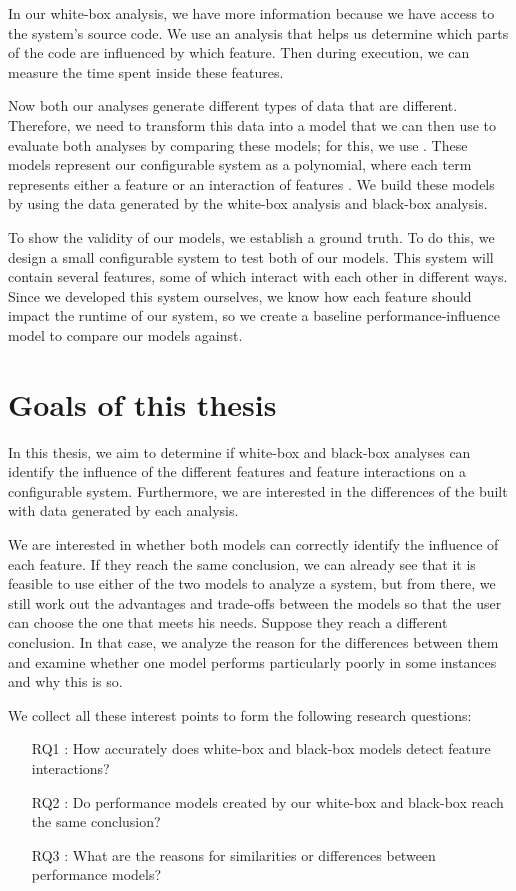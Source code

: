In our white-box analysis, we have more information because we have access to the system's source code.
We use an analysis that helps us determine which parts of the code are influenced by which feature.
Then during execution, we can measure the time spent inside these features.

Now both our analyses generate different types of data that are different. 
Therefore, we need to transform this data into a model that we can then use to evaluate both analyses by comparing these models; 
for this, we use \perfInfluenceModel. These models represent our configurable system as a polynomial, 
where each term represents either a feature or an interaction of features \cite{Performance-influence-models-for-highly-configurable-systems}.
We build these models by using the data generated by the white-box analysis and black-box analysis. 

To show the validity of our models, we establish a ground truth. To do this, we design a small configurable system to test both of our 
models. This system will contain several features, some of which interact with each other in different ways. 
Since we developed this system ourselves, we know how each feature should impact the runtime of our system, so we create
a baseline performance-influence model to compare our models against.


\section{Goals of this thesis}
In this thesis, we aim to determine if white-box and black-box analyses can identify the influence of the different features and 
feature interactions on a configurable system.
Furthermore, we are interested in the differences of the  built with data generated by each analysis.

We are interested in whether both models can correctly identify the influence of each feature.
If they reach the same conclusion, we can already see that it is feasible to use either of the two models to analyze a system,
but from there, we still work out the advantages and trade-offs between the models so that the user can choose the one that meets his needs.
Suppose they reach a different conclusion. In that case, we analyze the reason for the 
differences between them and examine whether one model performs particularly poorly in some instances and why this is so.

We collect all these interest points to form the following research questions:

\begin{itemize}\label{researchQuestions}
\item[RQ1]: How accurately does white-box and black-box models detect feature interactions? 
\item[RQ2]: Do performance models created by our white-box and black-box reach the same conclusion?
\item[RQ3]: What are the reasons for similarities or differences between performance models?
\end{itemize}
